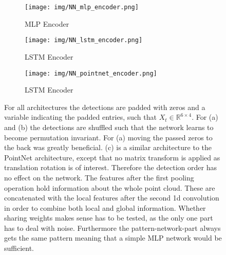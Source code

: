 \documentclass[12pt,a4paper]{article}
\begin{document}
\begin{figure}[!htbp]
	\begin{center}
		\begin{subfigure}[b]{0.49\textwidth}
			\label{NN_mlp_encoder}
			\texttt{[image: img/NN\_mlp\_encoder.png]}
			\caption{MLP Encoder}
		\end{subfigure}
		\begin{subfigure}[b]{0.49\textwidth}
			\label{NN_lstm_encoder}
			\texttt{[image: img/NN\_lstm\_encoder.png]}
			\caption{LSTM Encoder}
		\end{subfigure}
	  \begin{subfigure}[b]{\textwidth}
		\label{NN_lstm_encoder}
		\texttt{[image: img/NN\_pointnet\_encoder.png]}
		\caption{LSTM Encoder}
	  \end{subfigure}
	\end{center}
	\caption{For all architectures the detections are padded with zeros and a variable indicating the padded entries, such that $X_t \in \mathbb{R}^{6\times4}$. For (a) and (b) the detections are shuffled such that the network learns to become permutation invariant. For (a) moving the passed zeros to the back was greatly beneficial. (c) is a similar architecture to the PointNet \cite{PointNet} architecture, except that no matrix transform is applied as translation rotation is of interest. Therefore the detection order has no effect on the network. The features after the first pooling operation hold information about the whole point cloud. These are concatenated with the local features after the second 1d convolution in order to combine both local and global information. Whether sharing weights makes sense has to be tested, as the only one part has to deal with noise. Furthermore the pattern-network-part always gets the same pattern meaning that a simple MLP network would be sufficient.}
	\label{encoder_architecture}
\end{figure}
\end{document}
